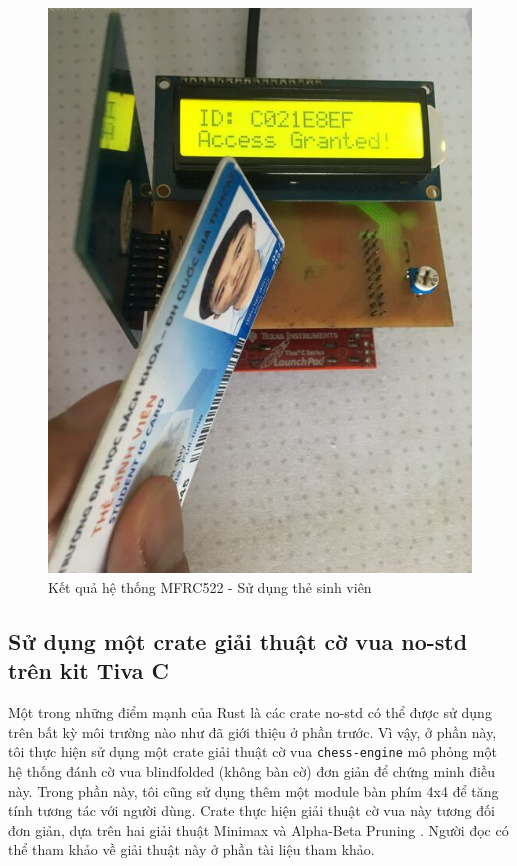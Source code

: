 \begin{figure}[ht]
\centering
\includegraphics[scale=0.3]{images/mfrc522_student.jpg}
\caption{Kết quả hệ thống MFRC522 - Sử dụng thẻ sinh viên}
\label{fig:rc522_student}
\end{figure}

\clearpage
\subsection{Sử dụng một crate giải thuật cờ vua no-std trên kit Tiva C}\label{lbl:rust_chess}
Một trong những điểm mạnh của Rust là các crate no-std có thể được sử dụng trên bất kỳ môi trường nào như đã giới thiệu ở phần trước.
Vì vậy, ở phần này, tôi thực hiện sử dụng một crate giải thuật cờ vua \texttt{chess-engine} \cite{rust_chess_engine} mô phỏng một hệ thống đánh cờ vua blindfolded (không bàn cờ) đơn giản để chứng minh điều này.
Trong phần này, tôi cũng sử dụng thêm một module bàn phím 4x4 để tăng tính tương tác với người dùng.
Crate thực hiện giải thuật cờ vua này tương đối đơn giản, dựa trên hai giải thuật Minimax \cite{minimax_chess_programming} và Alpha-Beta Pruning \cite{alpha_beta_chess_programming}.
Người đọc có thể tham khảo về giải thuật này ở phần tài liệu tham khảo.

